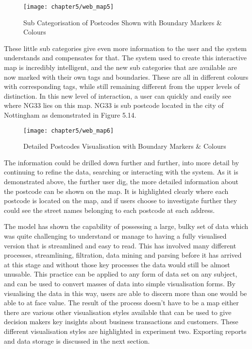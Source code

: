 \begin{figure}
\centering
\texttt{[image: chapter5/web\_map5]}
\caption{Sub Categorisation of Postcodes Shown with Boundary Markers & Colours}
\end{figure} 

These little sub categories give even more information to the user and the system understands and compensates for that. The system used to create this interactive map is incredibly intelligent, and the new sub categories that are available are now marked with their own tags and boundaries. These are all in different colours with corresponding tags, while still remaining different from the upper levels of distinction. In this new level of interaction, a user can quickly and easily see where NG33 lies on this map. NG33 is sub postcode located in the city of Nottingham as demonstrated in Figure 5.14.

\begin{figure}
\centering
\texttt{[image: chapter5/web\_map6]}
\caption{Detailed Postcodes Visualisation with Boundary Markers & Colours}
\end{figure} 

The information could be drilled down further and further, into more detail by continuing to refine the data, searching or interacting with the system. As it is demonstrated above, the further user dig, the more detailed information about the postcode can be shown on the map. It is highlighted clearly where each postcode is located on the map, and if users choose to investigate further they could see the street names belonging to each postcode at each address.

The model has shown the capability of possessing a large, bulky set of data which was quite challenging to understand or manage to having a fully visualised version that is streamlined and easy to read. This has involved many different processes, streamlining, filtration, data mining and parsing before it has arrived at this stage and without those key processes the data would still be almost unusable. This practice can be applied to any form of data set on any subject, and can be used to convert masses of data into simple visualisation forms. By visualising the data in this way, users are able to discern more than one would be able to at face value. The result of the process doesn't have to be a map either there are various other visualisation styles available that can be used to give decision makers key insights about business transactions and customers. These different visualisation styles are highlighted in experiment two. Exporting reports and data storage is discussed in the next section.

